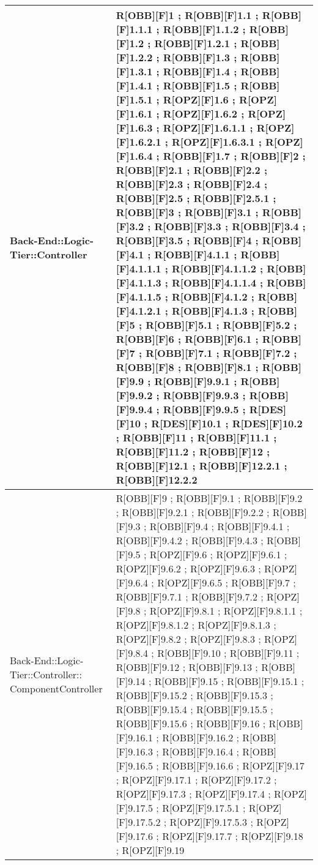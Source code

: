 \begin{table}[h]
\begin{tabular}{|p{}|p{}|}
			Back-End::Logic-Tier::Controller & R[OBB][F]1 ; R[OBB][F]1.1 ; R[OBB][F]1.1.1 ; R[OBB][F]1.1.2 ; R[OBB][F]1.2 ; R[OBB][F]1.2.1 ; R[OBB][F]1.2.2 ; R[OBB][F]1.3 ; R[OBB][F]1.3.1 ; R[OBB][F]1.4 ; R[OBB][F]1.4.1 ; R[OBB][F]1.5 ; R[OBB][F]1.5.1 ; R[OPZ][F]1.6 ; R[OPZ][F]1.6.1 ; R[OPZ][F]1.6.2 ; R[OPZ][F]1.6.3 ; R[OPZ][F]1.6.1.1 ; R[OPZ][F]1.6.2.1 ; R[OPZ][F]1.6.3.1 ; R[OPZ][F]1.6.4 ; R[OBB][F]1.7 ; R[OBB][F]2 ; R[OBB][F]2.1 ; R[OBB][F]2.2 ; R[OBB][F]2.3 ; R[OBB][F]2.4 ; R[OBB][F]2.5 ; R[OBB][F]2.5.1 ; R[OBB][F]3 ; R[OBB][F]3.1 ; R[OBB][F]3.2 ; R[OBB][F]3.3 ; R[OBB][F]3.4 ; R[OBB][F]3.5 ;  R[OBB][F]4 ; R[OBB][F]4.1 ; R[OBB][F]4.1.1 ; R[OBB][F]4.1.1.1 ; R[OBB][F]4.1.1.2 ; R[OBB][F]4.1.1.3 ; R[OBB][F]4.1.1.4 ; R[OBB][F]4.1.1.5 ; R[OBB][F]4.1.2 ; R[OBB][F]4.1.2.1 ; R[OBB][F]4.1.3 ; R[OBB][F]5 ; R[OBB][F]5.1 ; R[OBB][F]5.2 ; R[OBB][F]6 ; R[OBB][F]6.1 ; R[OBB][F]7 ; R[OBB][F]7.1 ; R[OBB][F]7.2 ; R[OBB][F]8 ; R[OBB][F]8.1 ; R[OBB][F]9.9 ; R[OBB][F]9.9.1 ; R[OBB][F]9.9.2 ; R[OBB][F]9.9.3 ; R[OBB][F]9.9.4 ; R[OBB][F]9.9.5 ; R[DES][F]10 ; R[DES][F]10.1 ; R[DES][F]10.2 ; R[OBB][F]11 ; R[OBB][F]11.1 ; R[OBB][F]11.2 ; R[OBB][F]12 ; R[OBB][F]12.1 ; R[OBB][F]12.2.1 ; R[OBB][F]12.2.2 \\ \midrule
			Back-End::Logic-Tier::Controller:: ComponentController & R[OBB][F]9 ; R[OBB][F]9.1 ; R[OBB][F]9.2 ; R[OBB][F]9.2.1 ; R[OBB][F]9.2.2 ; R[OBB][F]9.3 ; R[OBB][F]9.4 ; R[OBB][F]9.4.1 ; R[OBB][F]9.4.2 ; R[OBB][F]9.4.3 ; R[OBB][F]9.5 ; R[OPZ][F]9.6 ; R[OPZ][F]9.6.1 ; R[OPZ][F]9.6.2 ; R[OPZ][F]9.6.3 ; R[OPZ][F]9.6.4 ; R[OPZ][F]9.6.5 ; R[OBB][F]9.7 ; R[OBB][F]9.7.1 ; R[OBB][F]9.7.2 ; R[OPZ][F]9.8 ; R[OPZ][F]9.8.1 ; R[OPZ][F]9.8.1.1 ; R[OPZ][F]9.8.1.2 ; R[OPZ][F]9.8.1.3 ; R[OPZ][F]9.8.2 ; R[OPZ][F]9.8.3 ; R[OPZ][F]9.8.4 ; R[OBB][F]9.10 ; R[OBB][F]9.11 ; R[OBB][F]9.12 ; R[OBB][F]9.13 ; R[OBB][F]9.14 ; R[OBB][F]9.15 ; R[OBB][F]9.15.1 ; R[OBB][F]9.15.2 ; R[OBB][F]9.15.3 ; R[OBB][F]9.15.4 ; R[OBB][F]9.15.5 ; R[OBB][F]9.15.6 ; R[OBB][F]9.16 ; R[OBB][F]9.16.1 ; R[OBB][F]9.16.2 ; R[OBB][F]9.16.3 ; R[OBB][F]9.16.4 ; R[OBB][F]9.16.5 ; R[OBB][F]9.16.6 ; R[OPZ][F]9.17 ; R[OPZ][F]9.17.1 ; R[OPZ][F]9.17.2 ; R[OPZ][F]9.17.3 ; R[OPZ][F]9.17.4 ; R[OPZ][F]9.17.5 ; R[OPZ][F]9.17.5.1 ; R[OPZ][F]9.17.5.2 ; R[OPZ][F]9.17.5.3 ; R[OPZ][F]9.17.6 ; R[OPZ][F]9.17.7 ; R[OPZ][F]9.18 ; R[OPZ][F]9.19 \\ \midrule

		\end{tabular}
	\end{table}

